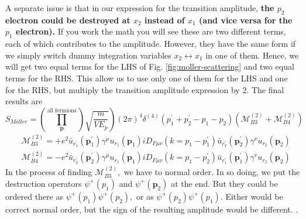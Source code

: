 A separate issue is that in our expression for the transition amplitude, \textbf{the $p_{2}$ electron could be destroyed at $x_{2}$ instead of $x_{1}$ (and vice versa for the $p_{1}$ electron).} If you work the math you will see these are two different terms, each of which contributes to the amplitude. However, they have the same form if we simply switch dummy integration variables $x_{2} \leftrightarrow x_{1}$ in one of them. Hence, we will get two equal terms for the LHS of Fig. \ref{fig:moller-scattering} and two equal terms for the RHS. This allow us to use only one of them for the LHS and one for the RHS, but multiply the transition amplitude expression by 2. The final results are
\begin{equation}
\left.S_{M o l l e r}=\left(\prod_{\mathbf{p}}^{\text {all fermions}}\right) \sqrt{\frac{m}{V E_{p}}}\right)(2 \pi)^{4} \delta^{(4)}\left(p_{1}^{\prime}+p_{2}^{\prime}-p_{1}-p_{2}\right)\left(\mathcal{M}_{B 3}^{(2)}+\mathcal{M}_{B 4}^{(2)}\right)
\end{equation}
\begin{equation}
\begin{aligned}
&\mathcal{M}_{B 3}^{(2)}=+e^{2} \bar{u}_{r_1^{\prime}}\left(\mathbf{p}_{1}^{\prime}\right) \gamma^{\mu} u_{r_1}\left(\mathbf{p}_{1}\right) i D_{F \mu \nu}\left(k=p_{1}-p_{1}^{\prime}\right) \bar{u}_{r_{2}^{\prime}}\left(\mathbf{p}_{2}^{\prime}\right) \gamma^{\nu} u_{r_{2}}\left(\mathbf{p}_{2}\right)\\
&\mathcal{M}_{B 4}^{(2)}=-e^{2} \bar{u}_{r_{2}^{\prime}}\left(\mathbf{p}_{2}^{\prime}\right) \gamma^{\mu} u_{r_{1}}\left(\mathbf{p}_{1}\right) i D_{F \mu \nu}\left(k=p_{1}-p_{2}^{\prime}\right) \bar{u}_{r_{1}^{\prime}}\left(\mathbf{p}_{1}^{\prime}\right) \gamma^{v} u_{r_{2}}\left(\mathbf{p}_{2}\right)
\end{aligned}
\end{equation}
In the process of finding $\mathcal{M}_{B 3}^{(2)},$ we have to normal order. In so doing, we put the destruction operators $\psi^{+}\left(p_{1}\right)$ and $\psi^{+}\left(\mathbf{p}_{2}\right)$ at the end. But they could be ordered there as $\psi^{+}\left(p_{1}\right) \psi^{+}\left(p_{2}\right),$ or as $\psi^{+}\left(p_{2}\right) \psi^{+}\left(p_{1}\right) .$ Either would be correct normal order, but the sign of the resulting amplitude would be different. .

